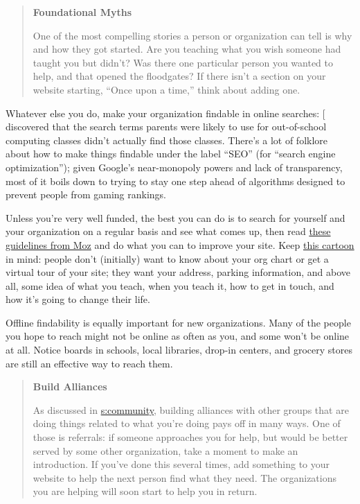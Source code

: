 \begin{quote}\setlength{\parindent}{0pt}
\textbf{Foundational Myths}

One of the most compelling stories a person or organization can tell
is why and how they got started. Are you teaching what you wish
someone had taught you but didn't? Was there one particular person you
wanted to help, and that opened the floodgates? If there isn't a
section on your website starting, ``Once upon a time,'' think about
adding one.
\end{quote}

Whatever else you do, make your organization findable in online
searches: {[}\protect[\hyperlink{b:DiSa2014b}{DiSa2014b}]{]} discovered that the search terms parents
were likely to use for out-of-school computing classes didn't actually
find those classes. There's a lot of folklore about how to make things
findable under the label ``SEO'' (for ``search engine optimization''); given
Google's near-monopoly powers and lack of transparency, most of it boils
down to trying to stay one step ahead of algorithms designed to prevent
people from gaming rankings.

Unless you're very well funded, the best you can do is to search for
yourself and your organization on a regular basis and see what comes
up, then read \href{https://moz.com/learn/seo/on-page-factors}{these guidelines from Moz} and do what
you can to improve your site. Keep \href{https://xkcd.com/773/}{this cartoon} in
mind: people don't (initially) want to know about your org chart or
get a virtual tour of your site; they want your address, parking
information, and above all, some idea of what you teach, when you
teach it, how to get in touch, and how it's going to change their
life.

Offline findability is equally important for new organizations. Many of
the people you hope to reach might not be online as often as you, and
some won't be online at all. Notice boards in schools, local libraries,
drop-in centers, and grocery stores are still an effective way to reach
them.

\begin{quote}\setlength{\parindent}{0pt}
\textbf{Build Alliances}

As discussed in \protect\hyperlink{CHAPTER}{s:community}, building alliances with
other groups that are doing things related to what you're doing pays
off in many ways. One of those is referrals: if someone approaches you
for help, but would be better served by some other organization, take
a moment to make an introduction. If you've done this several times,
add something to your website to help the next person find what they
need. The organizations you are helping will soon start to help you in
return.
\end{quote}

